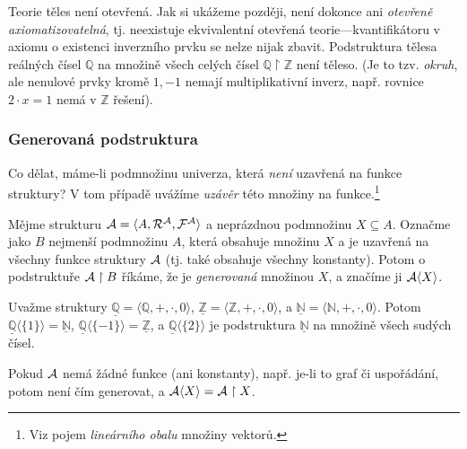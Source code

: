 \begin{example}
    Teorie těles není otevřená. Jak si ukážeme později, není dokonce ani \emph{otevřeně axiomatizovatelná}, tj. neexistuje ekvivalentní otevřená teorie---kvantifikátoru v axiomu o existenci inverzního prvku se nelze nijak zbavit. Podstruktura tělesa reálných čísel $\mathbb Q$ na množině všech celých čísel $\mathbb Q\restriction\mathbb Z$ není těleso. (Je to tzv. \emph{okruh}, ale nenulové prvky kromě $1,-1$ nemají multiplikativní inverz, např. rovnice $2\cdot x=1$ nemá v $\mathbb Z$ řešení).
\end{example}

\subsubsection{Generovaná podstruktura}

Co dělat, máme-li podmnožinu univerza, která \emph{není} uzavřená na funkce struktury? V tom případě uvážíme \emph{uzávěr} této množiny na funkce.\footnote{Viz pojem \emph{lineárního obalu} množiny vektorů.}

\begin{definition}
    Mějme strukturu $\mathcal{A}=\langle A,\mathcal R^\mathcal A,\mathcal F^\mathcal A\rangle$ a neprázdnou podmnožinu $X\subseteq A$. Označme jako $B$ nejmenší podmnožinu $A$, která obsahuje množinu $X$ a je uzavřená na všechny funkce struktury $\mathcal{A}$ (tj. také obsahuje všechny konstanty). Potom o podstruktuře $\mathcal{A}\restriction B$ říkáme, že je \emph{generovaná} množinou $X$, a značíme ji $\mathcal{A}\langle X\rangle$.
\end{definition}

\begin{example}
    Uvažme struktury $\underline{\mathbb Q}=\langle\mathbb Q,+,\cdot,0\rangle$, $\underline{\mathbb Z}=\langle\mathbb Z,+,\cdot,0\rangle$, a $\underline{\mathbb N}=\langle\mathbb N,+,\cdot,0\rangle$. Potom $\underline{\mathbb Q}\langle\{1\}\rangle=\underline{\mathbb N}$, $\underline{\mathbb Q}\langle\{-1\}\rangle=\underline{\mathbb Z}$, a $\underline{\mathbb Q}\langle\{2\}\rangle$ je podstruktura $\underline{\mathbb N}$ na množině všech sudých čísel.
\end{example}

\begin{example}
    Pokud $\mathcal{A}$ nemá žádné funkce (ani konstanty), např. je-li to graf či uspořádání, potom není čím generovat, a $\mathcal{A}\langle X\rangle=\mathcal{A}\restriction X$.
\end{example}

